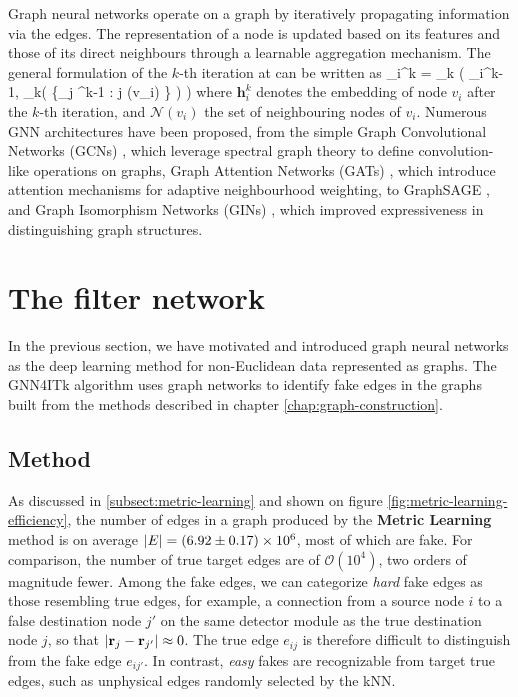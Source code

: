Graph neural networks operate on a graph by iteratively propagating information via the edges.
The representation of a node is updated based on its features and those of its direct neighbours through a learnable aggregation mechanism.
The general formulation of the $k$-th iteration at can be written as 
\beq
\label{eq:gnn:1}
_i^k = _k \left( _i^{k-1}, _k\left( \{_j ^{k-1} : j\in {} (v_i) \} \right) \right)
\eeq
where $\mathbf{h}_i^k$ denotes the embedding of node $v_i$ after the $k$-th iteration, and $\mathcal{N} (v_i)$ the set of neighbouring nodes of $v_i$. 
Numerous GNN architectures have been proposed, from the simple Graph Convolutional Networks (GCNs) \cite{gcn}, which leverage spectral graph theory to define convolution-like operations on graphs, Graph Attention Networks (GATs) \cite{gat}, which introduce attention mechanisms for adaptive neighbourhood weighting, to GraphSAGE \cite{graphsage}, and Graph Isomorphism Networks (GINs) \cite{gin}, which improved expressiveness in distinguishing graph structures.

\section{The filter network}
\label{sect:chap-gnn-filter-network}

In the previous section, we have motivated and introduced graph neural networks as the deep learning method for non-Euclidean data represented as graphs. 
The GNN4ITk algorithm uses graph networks to identify fake edges in the graphs built from the methods described in chapter \ref{chap:graph-construction}. 

\subsection{Method}

As discussed in \ref{subsect:metric-learning} and shown on figure \ref{fig:metric-learning-efficiency}, the number of edges in a graph produced by the \textbf{Metric Learning} method is on average $\abs{E} = (6.92\pm0.17)\times 10^6$, most of which are fake. 
For comparison, the number of true target edges are of $\mathcal{O}(10^4)$, two orders of magnitude fewer. 
Among the fake edges, we can categorize \textit{hard} fake edges as those resembling true edges, for example, a connection from a source node $i$ to a false destination node $j'$ on the same detector module as the true destination node $j$, so that $\abs{\mathbf{r}_j - \mathbf{r}_{j'}} \approx 0$. 
The true edge $e_{ij}$ is therefore difficult to distinguish from the fake edge $e_{ij'}$.
In contrast, \textit{easy} fakes are recognizable from target true edges, such as unphysical edges randomly selected by the kNN. 

